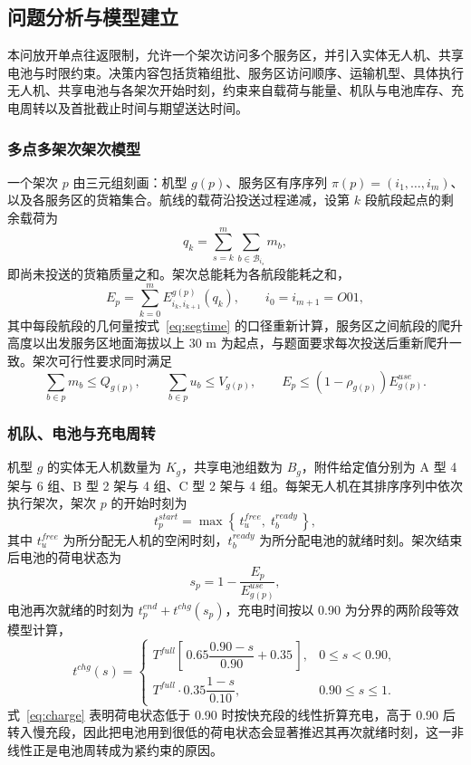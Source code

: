 \documentclass[bwprint]{gmcmthesis}
\begin{document}
\subsection{问题分析与模型建立}
本问放开单点往返限制，允许一个架次访问多个服务区，并引入实体无人机、共享电池与时限约束。决策内容包括货箱组批、服务区访问顺序、运输机型、具体执行无人机、共享电池与各架次开始时刻，约束来自载荷与能量、机队与电池库存、充电周转以及首批截止时间与期望送达时间。

\subsubsection{多点多架次架次模型}
一个架次 $p$ 由三元组刻画：机型 $g(p)$、服务区有序序列 $\pi(p)=(i_1,\dots,i_m)$、以及各服务区的货箱集合。航线的载荷沿投送过程递减，设第 $k$ 段航段起点的剩余载荷为
\begin{equation}
q_k=\sum_{s=k}^{m}\sum_{b\in\mathcal{B}_{i_s}}m_b,
\label{eq:decpayload}
\end{equation}
即尚未投送的货箱质量之和。架次总能耗为各航段能耗之和，
\begin{equation}
E_p=\sum_{k=0}^{m}E_{i_k,i_{k+1}}^{g(p)}\!\left(q_k\right),\qquad i_0=i_{m+1}=O01,
\label{eq:sortieenergy}
\end{equation}
其中每段航段的几何量按式~\eqref{eq:segtime} 的口径重新计算，服务区之间航段的爬升高度以出发服务区地面海拔以上 30 m 为起点，与题面要求每次投送后重新爬升一致。架次可行性要求同时满足
\begin{equation}
\sum_{b\in p}m_b\le Q_{g(p)},\qquad
\sum_{b\in p}u_b\le V_{g(p)},\qquad
E_p\le\left(1-\rho_{g(p)}\right)E_{g(p)}^{use}.
\label{eq:sortiecons}
\end{equation}

\subsubsection{机队、电池与充电周转}
机型 $g$ 的实体无人机数量为 $K_g$，共享电池组数为 $B_g$，附件给定值分别为 A 型 4 架与 6 组、B 型 2 架与 4 组、C 型 2 架与 4 组。每架无人机在其排序序列中依次执行架次，架次 $p$ 的开始时刻为
\begin{equation}
t_p^{start}=\max\left\{\,t_u^{free},\;t_b^{ready}\,\right\},
\label{eq:starttime}
\end{equation}
其中 $t_u^{free}$ 为所分配无人机的空闲时刻，$t_b^{ready}$ 为所分配电池的就绪时刻。架次结束后电池的荷电状态为
\begin{equation}
s_p=1-\frac{E_p}{E_{g(p)}^{use}},
\label{eq:soc}
\end{equation}
电池再次就绪的时刻为 $t_p^{end}+t^{chg}(s_p)$，充电时间按以 0.90 为分界的两阶段等效模型计算，
\begin{equation}
t^{chg}(s)=
\begin{cases}
T^{full}\left[\,0.65\dfrac{0.90-s}{0.90}+0.35\,\right], & 0\le s<0.90,\\[2mm]
T^{full}\cdot0.35\dfrac{1-s}{0.10}, & 0.90\le s\le1 .
\end{cases}
\label{eq:charge}
\end{equation}
式~\eqref{eq:charge} 表明荷电状态低于 0.90 时按快充段的线性折算充电，高于 0.90 后转入慢充段，因此把电池用到很低的荷电状态会显著推迟其再次就绪时刻，这一非线性正是电池周转成为紧约束的原因。
\end{document}
